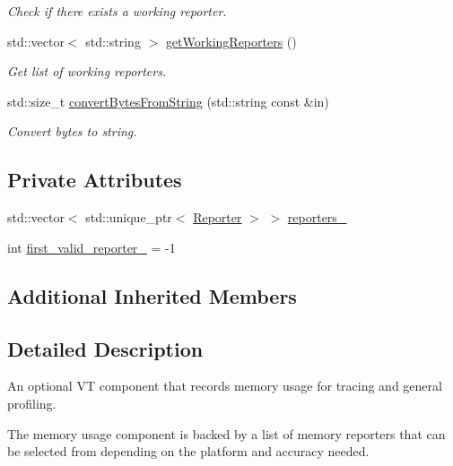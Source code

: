 \begin{DoxyCompactItemize}
\begin{DoxyCompactList}\small\item\em Check if there exists a working reporter. \end{DoxyCompactList}\item 
std\+::vector$<$ std\+::string $>$ \hyperlink{structvt_1_1util_1_1memory_1_1_memory_usage_a23bded824e4360e4389d9869c3bd7f18}{get\+Working\+Reporters} ()
\begin{DoxyCompactList}\small\item\em Get list of working reporters. \end{DoxyCompactList}\item 
std\+::size\+\_\+t \hyperlink{structvt_1_1util_1_1memory_1_1_memory_usage_ad047c8acc218403b53ec97c82fa7d7e3}{convert\+Bytes\+From\+String} (std\+::string const \&in)
\begin{DoxyCompactList}\small\item\em Convert bytes to string. \end{DoxyCompactList}\end{DoxyCompactItemize}
\subsection*{Private Attributes}
\begin{DoxyCompactItemize}
\item 
std\+::vector$<$ std\+::unique\+\_\+ptr$<$ \hyperlink{structvt_1_1util_1_1memory_1_1_reporter}{Reporter} $>$ $>$ \hyperlink{structvt_1_1util_1_1memory_1_1_memory_usage_afe2db27e57d4fb6f0356c06a376cd568}{reporters\+\_\+}
\item 
int \hyperlink{structvt_1_1util_1_1memory_1_1_memory_usage_a714d3de79740091fce1761c7c0a858bd}{first\+\_\+valid\+\_\+reporter\+\_\+} = -\/1
\end{DoxyCompactItemize}
\subsection*{Additional Inherited Members}


\subsection{Detailed Description}
An optional VT component that records memory usage for tracing and general profiling. 

The memory usage component is backed by a list of memory reporters that can be selected from depending on the platform and accuracy needed. 

